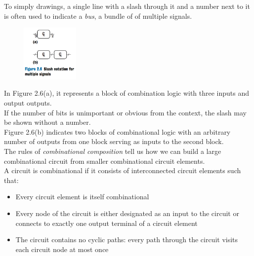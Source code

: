 \documentclass[12pt]{article}
\theoremstyle{definition}
\begin{document}
  To simply drawings, a single line with a slash through it and a number next to it is often used to indicate a \emph{bus}, a bundle of of multiple signals. \\

  \begin{figure}
    \centering
    \includegraphics[width=0.25\textwidth]{pictures/busExample.png}
  \end{figure}
  In Figure 2.6(a), it represents a block of combination logic with three inputs and output outputs. \\
  If the number of bits is unimportant or obvious from the context, the slash may be shown without a number. \\
  Figure 2.6(b) indicates two blocks of combinational logic with an arbitrary number of outputs from one block serving as inputs to the second block. \\

  The rules of \emph{combinational composition} tell us how we can build a large combinational circuit from smaller combinational circuit elements. \\
  A circuit is combinational if it consists of interconnected circuit elements such that:
  \begin{itemize}
    \item Every circuit element is itself combinational
    \item Every node of the circuit is either designated as an input to the circuit or connects to exactly one output terminal of a circuit element
    \item The circuit contains no cyclic paths: every path through the circuit visits each circuit node at most once
  \end{itemize}
\end{document}
